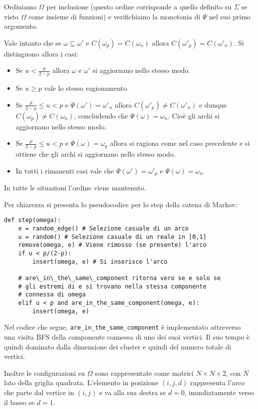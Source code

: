 \documentclass[]{marticle}
\begin{document}
Ordiniamo $\Omega$ per inclusione (questo ordine corrisponde a quello definito
su $\Sigma$ se visto $\Omega$ come insieme di funzioni) e verifichiamo la
monotonia di $\Psi$ nel suo primo argomento.

Vale intanto che se $\omega\subseteq\omega'$ e $C(\omega_p)=C(\omega_n)$ allora
$C(\omega'_p) = C(\omega'_n)$. Si distinguono allora i casi:
\begin{itemize}
    \item Se $u<\frac{p}{2-p}$ allora $\omega$ e $\omega'$ si aggiornano nello
        stesso modo.
    \item Se $u\geq p$ vale lo stesso ragionamento.
    \item Se $\frac{p}{2-p} \leq u < p$ e $\Psi(\omega') = \omega'_n$ allora
        $C(\omega'_p)\neq C(\omega'_n)$ e dunque $C(\omega_p)\neq C(\omega_n)$,
        concludendo che $\Psi(\omega) = \omega_n$. Cio\`e gli archi si
        aggiornano nello stesso modo.
    \item Se $\frac{p}{2-p} \leq u < p$ e $\Psi(\omega) = \omega_p$ allora si
        ragiona come nel caso precedente e si ottiene che gli archi si
        aggiornano nello stesso modo.
    \item In tutti i rimanenti casi vale che $\Psi(\omega')=\omega'_p$ e
        $\Psi(\omega)=\omega_n$.
\end{itemize}
In tutte le situazioni l'ordine viene mantenuto.

Per chiarezza si presenta lo pseudocodice per lo step della catena di Markov:
\begin{lstlisting}
def step(omega):
    e = random_edge() # Selezione casuale di un arco
    u = random() # Selezione casuale di un reale in [0,1]
    remove(omega, e) # Viene rimosso (se presente) l'arco
    if u < p/(2-p):
        insert(omega, e) # Si inserisce l'arco

    # are\_in\_the\_same\_component ritorna vero se e solo se 
    # gli estremi di e si trovano nella stessa componente
    # connessa di omega
    elif u < p and are_in_the_same_component(omega, e):
        insert(omega, e)
\end{lstlisting}

Nel codice che segue, \texttt{are\_in\_the\_same\_component} \`e implementato
attreverso una visita BFS della componente connessa di uno dei suoi vertici. Il
suo tempo \`e quindi dominato dalla dimensione dei cluster e quindi del numero
totale di vertici. 

Inoltre le configurazioni su $\Omega$ sono rappresentate come matrici $N\times N
\times 2$, con $N$ lato della griglia quadrata. L'elemento in posizione
$(i,j,d)$ rappresenta l'arco che parte dal vertice in $(i,j)$ e va alla sua
destra se $d=0$, immdiatamente verso il basso se $d=1$.
\end{document}
